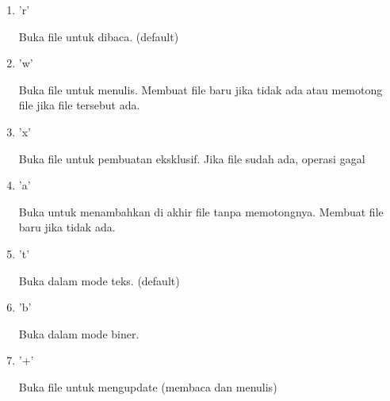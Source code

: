 \begin{enumerate}


\item 'r' \hspace*{0.5in}  \par
\noindent 
Buka file untuk dibaca. (default) \par
\vspace{12pt}
\noindent 

\item 'w' \hspace*{0.5in}  \par
\noindent 
Buka file untuk menulis. Membuat file baru jika tidak ada atau memotong file jika file tersebut ada. \par
\vspace{12pt}
\noindent 

\item 'x' \hspace*{0.5in}  \par
\noindent 
Buka file untuk pembuatan eksklusif. Jika file sudah ada, operasi gagal \par
\vspace{12pt}
\noindent 

\item 'a' \hspace*{0.5in}  \par
\noindent 
Buka untuk menambahkan di akhir file tanpa memotongnya. Membuat file baru jika tidak ada. \par
\vspace{12pt}
\noindent 

\item 't' \hspace*{0.5in}  \par
\noindent 
Buka dalam mode teks. (default) \par
\vspace{12pt}
\noindent 

\item 'b' \par
\noindent 
Buka dalam mode biner. \par
\vspace{12pt}
\noindent 
\item '+' \par
\noindent 
Buka file untuk mengupdate (membaca dan menulis) \par
\vspace{12pt}
\noindent 

\end {enumerate}

